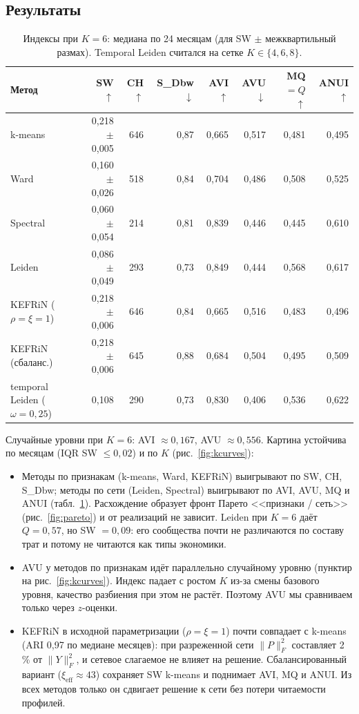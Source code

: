 \documentclass[11pt,a4paper]{article}
\begin{document}
\subsection{Результаты}\label{sec:results}

\begin{table}[htbp]
\centering\small
\caption{Индексы при $K=6$: медиана по 24 месяцам (для SW $\pm$ межквартильный размах). Temporal Leiden считался на сетке $K\in\{4,6,8\}$.}
\label{tab:icvi-k6}
\setlength{\tabcolsep}{4pt}
\begin{tabular}{lrrrrrrr}
\toprule
Метод & SW $\uparrow$ & CH $\uparrow$ & S\_Dbw $\downarrow$ & AVI $\uparrow$ & AVU $\downarrow$ & MQ$=Q$ $\uparrow$ & ANUI $\uparrow$ \\
\midrule
k-means & 0{,}218 $\pm$ 0{,}005 & 646 & 0{,}87 & 0{,}665 & 0{,}517 & 0{,}481 & 0{,}495 \\
Ward & 0{,}160 $\pm$ 0{,}026 & 518 & 0{,}84 & 0{,}704 & 0{,}486 & 0{,}508 & 0{,}525 \\
Spectral & 0{,}060 $\pm$ 0{,}054 & 214 & 0{,}81 & 0{,}839 & 0{,}446 & 0{,}445 & 0{,}610 \\
Leiden & 0{,}086 $\pm$ 0{,}049 & 293 & 0{,}73 & 0{,}849 & 0{,}444 & 0{,}568 & 0{,}617 \\
KEFRiN ($\rho=\xi=1$) & 0{,}218 $\pm$ 0{,}006 & 646 & 0{,}84 & 0{,}665 & 0{,}516 & 0{,}483 & 0{,}496 \\
KEFRiN (сбаланс.) & 0{,}218 $\pm$ 0{,}006 & 645 & 0{,}88 & 0{,}684 & 0{,}504 & 0{,}495 & 0{,}509 \\
temporal Leiden ($\omega=0{,}25$) & 0{,}108 & 290 & 0{,}73 & 0{,}830 & 0{,}406 & 0{,}536 & 0{,}622 \\
\bottomrule
\end{tabular}
\end{table}

Случайные уровни при $K=6$: AVI $\approx 0{,}167$, AVU $\approx 0{,}556$. Картина устойчива по месяцам (IQR SW $\le 0{,}02$) и по $K$ (рис.~\ref{fig:kcurves}):
\begin{itemize}
\item Методы по признакам (k-means, Ward, KEFRiN) выигрывают по SW, CH, S\_Dbw; методы по сети (Leiden, Spectral) выигрывают по AVI, AVU, MQ и ANUI (табл.~\ref{tab:icvi-k6}). Расхождение образует фронт Парето <<признаки / сеть>> (рис.~\ref{fig:pareto}) и от реализаций не зависит. Leiden при $K=6$ даёт $Q=0{,}57$, но SW $=0{,}09$: его сообщества почти не различаются по составу трат и потому не читаются как типы экономики.
\item AVU у методов по признакам идёт параллельно случайному уровню (пунктир на рис.~\ref{fig:kcurves}). Индекс падает с ростом $K$ из-за смены базового уровня, качество разбиения при этом не растёт. Поэтому AVU мы сравниваем только через $z$-оценки.
\item KEFRiN в исходной параметризации ($\rho=\xi=1$) почти совпадает с k-means (ARI 0,97 по медиане месяцев): при разреженной сети $\|P\|_F^2$ составляет 2\,\% от $\|Y\|_F^2$, и сетевое слагаемое не влияет на решение. Сбалансированный вариант ($\xi_{\text{eff}} \approx 43$) сохраняет SW k-means и поднимает AVI, MQ и ANUI. Из всех методов только он сдвигает решение к сети без потери читаемости профилей.
\end{itemize}
\end{document}
